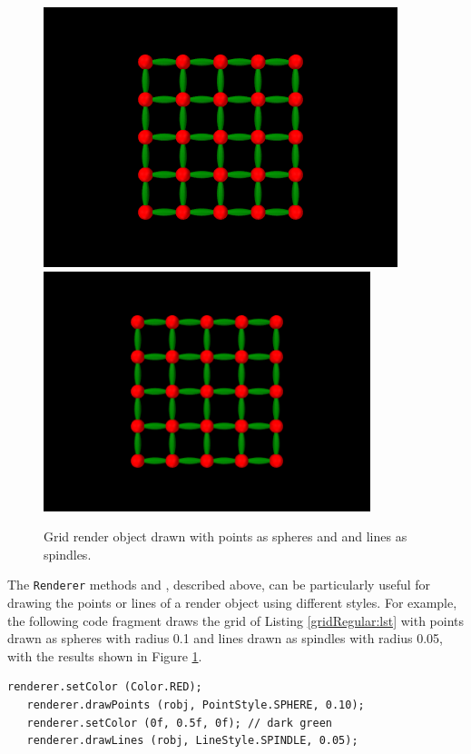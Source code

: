 \begin{figure}[t]
\begin{center}
\iflatexml
 \includegraphics[]{images/gridSolid}
\else
 \includegraphics[width=3.75in]{images/gridSolid}
\fi
\end{center}
\caption{Grid render object drawn with points as spheres and
and lines as spindles.}
\label{gridSolid:fig}
\end{figure}
%
The {\tt Renderer} methods
and
,
described above, can be particularly useful for drawing the points or
lines of a render object using different styles. For example, the
following code fragment draws the grid of Listing
\ref{gridRegular:lst} with points drawn as spheres with radius 0.1 and
lines drawn as spindles with radius 0.05, with the results
shown in Figure \ref{gridSolid:fig}.
%
\begin{lstlisting}[]
   renderer.setColor (Color.RED);
   renderer.drawPoints (robj, PointStyle.SPHERE, 0.10);
   renderer.setColor (0f, 0.5f, 0f); // dark green
   renderer.drawLines (robj, LineStyle.SPINDLE, 0.05);
\end{lstlisting}
%

